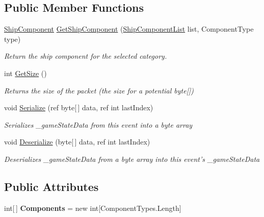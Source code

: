 \subsection*{Public Member Functions}
\begin{DoxyCompactItemize}
\item 
\hyperlink{class_skyrates_1_1_client_1_1_ship_1_1_ship_component}{Ship\-Component} \hyperlink{class_ship_data_a87215022e6e6f594fb58e0aa7f2900eb}{Get\-Ship\-Component} (\hyperlink{class_skyrates_1_1_client_1_1_ship_1_1_ship_component_list}{Ship\-Component\-List} list, Component\-Type type)
\begin{DoxyCompactList}\small\item\em Return the ship component for the selected category. \end{DoxyCompactList}\item 
int \hyperlink{class_ship_data_a9dc62e72a9c972a02f8d504e21ceeaf5}{Get\-Size} ()
\begin{DoxyCompactList}\small\item\em Returns the size of the packet (the size for a potential byte\mbox{[}\mbox{]}) \end{DoxyCompactList}\item 
void \hyperlink{class_ship_data_a6207f2504de150eeb3e7407803cbbddb}{Serialize} (ref byte\mbox{[}$\,$\mbox{]} data, ref int last\-Index)
\begin{DoxyCompactList}\small\item\em Serializes \-\_\-game\-State\-Data from this event into a byte array \end{DoxyCompactList}\item 
void \hyperlink{class_ship_data_a13f9971ec63b0e59d68d2d809a5c5c91}{Deserialize} (byte\mbox{[}$\,$\mbox{]} data, ref int last\-Index)
\begin{DoxyCompactList}\small\item\em Deserializes \-\_\-game\-State\-Data from a byte array into this event's \-\_\-game\-State\-Data \end{DoxyCompactList}\end{DoxyCompactItemize}
\subsection*{Public Attributes}
\begin{DoxyCompactItemize}
\item 
\hypertarget{class_ship_data_a70c6e40b595b8619ef9698f4bf64409a}{int\mbox{[}$\,$\mbox{]} {\bfseries Components} = new int\mbox{[}Component\-Types.\-Length\mbox{]}}\label{class_ship_data_a70c6e40b595b8619ef9698f4bf64409a}

\end{DoxyCompactItemize}
